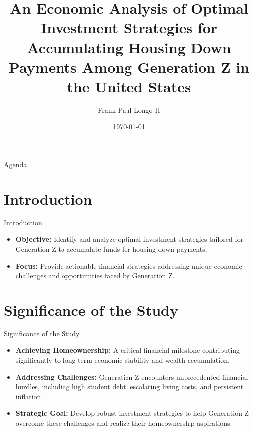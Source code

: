 \documentclass{beamer}
\title{An Economic Analysis of Optimal Investment Strategies for Accumulating Housing Down Payments Among Generation Z in the United States}
\author{Frank Paul Longo II}
\date{\today}
\begin{document}
\frame{\titlepage}

\begin{frame}{Agenda}
    \tableofcontents
\end{frame}

\section{Introduction}
\begin{frame}{Introduction}
    \begin{itemize}
        \item \textbf{Objective:} Identify and analyze optimal investment strategies tailored for Generation Z to accumulate funds for housing down payments.
        \item \textbf{Focus:} Provide actionable financial strategies addressing unique economic challenges and opportunities faced by Generation Z.
    \end{itemize}
\end{frame}

\section{Significance of the Study}
\begin{frame}{Significance of the Study}
    \begin{itemize}
        \item \textbf{Achieving Homeownership:} A critical financial milestone contributing significantly to long-term economic stability and wealth accumulation.
        \item \textbf{Addressing Challenges:} Generation Z encounters unprecedented financial hurdles, including high student debt, escalating living costs, and persistent inflation.
        \item \textbf{Strategic Goal:} Develop robust investment strategies to help Generation Z overcome these challenges and realize their homeownership aspirations.
    \end{itemize}
\end{frame}
\end{document}
